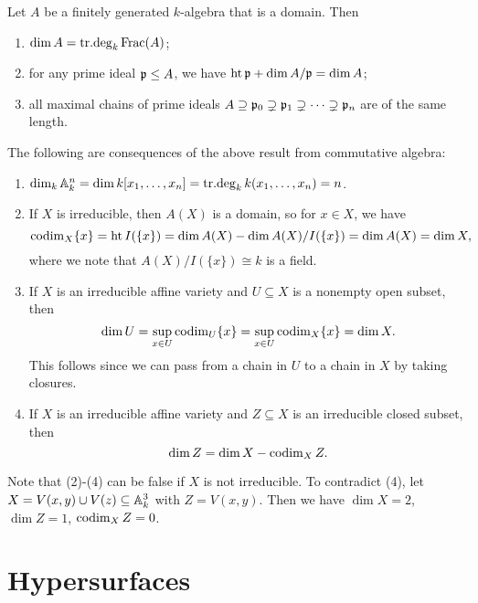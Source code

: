 \begin{theorem}
  Let $A$ be a finitely generated
  $k$-algebra that is a domain.
  Then
  \begin{enumerate}
    \item $\dim A = \operatorname{tr{.}deg}_k \operatorname{Frac}(A)$;
    \item for any prime ideal
      $\mathfrak{p} \le A$, we have
      $\operatorname{ht} \mathfrak{p} + \dim A / \mathfrak{p} = \dim A$;
    \item all maximal chains of
      prime ideals
      $A \supseteq \mathfrak{p}_0 \supsetneq \mathfrak{p}_1 \supsetneq \cdots \supsetneq \mathfrak{p}_n$
      are of the same length.
  \end{enumerate}
\end{theorem}

\begin{remark}
  The following are consequences of the
  above result from commutative algebra:
  \begin{enumerate}
    \item $\dim_k \mathbb{A}_k^n = \dim k[x_1, \dots, x_n] = \operatorname{tr{.}deg}_k k(x_1, \dots, x_n) = n$.
    \item If $X$ is irreducible, then
      $A(X)$ is a domain, so for
      $x \in X$, we have
      \[
        \operatorname{codim}_X \{x\}
        = \operatorname{ht} I(\{x\})
        = \dim A(X) - \dim A(X) / I(\{x\})
        = \dim A(X) = \dim X,
      \]
      where we note that $A(X) / I(\{x\}) \cong k$
      is a field.
    \item If $X$ is an irreducible affine
      variety and $U \subseteq X$ is a
      nonempty open subset, then
      \[
        \dim U = \sup_{x \in U} \operatorname{codim}_U \{x\}
        = \sup_{x \in U} \operatorname{codim}_X \{x\}
        = \dim X.
      \]
      This follows since we can
      pass from a chain in $U$ to a
      chain in $X$ by taking closures.
    \item If $X$ is an irreducible
      affine variety and $Z \subseteq X$
      is an irreducible closed subset, then
      \[
        \dim Z = \dim X - \operatorname{codim}_X Z.
      \]
  \end{enumerate}
  Note that (2)-(4) can be false if
  $X$ is not irreducible. To contradict
  (4),
  let $X = V(x, y) \cup V(z) \subseteq \mathbb{A}_k^3$ with
  $Z = V(x, y)$. Then we have
  $\dim X = 2$, $\dim Z = 1$, $\operatorname{codim}_X Z = 0$.
\end{remark}

\section{Hypersurfaces}

